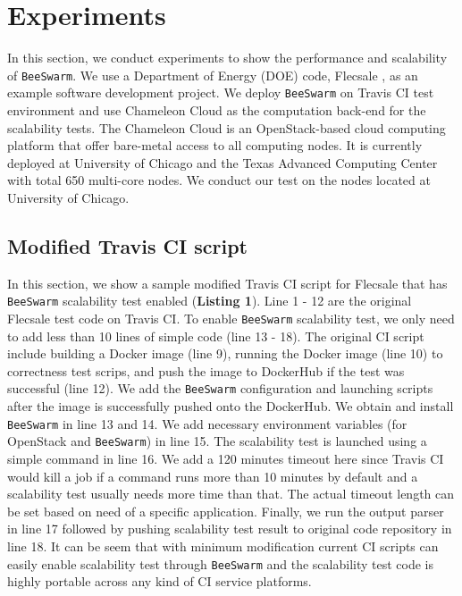 \section{Experiments}
\label{experiments}
In this section, we conduct experiments to show the performance and scalability of \texttt{BeeSwarm}. We use a Department of Energy (DOE) code, Flecsale \cite{charest2017flexible}, as an example software development project. We deploy \texttt{BeeSwarm} on Travis CI test environment and use Chameleon Cloud \cite{mambretti2015next} as the computation back-end for the scalability tests. The Chameleon Cloud is an OpenStack-based cloud computing platform that offer bare-metal access to all computing nodes. It is currently deployed at University of Chicago and the Texas Advanced Computing Center with total 650 multi-core nodes. We conduct our test on the nodes located at University of Chicago. 

\subsection{Modified Travis CI script}
In this section, we show a sample modified Travis CI script for Flecsale that has \texttt{BeeSwarm} scalability test enabled (\textbf{Listing 1}). Line 1 - 12 are the original Flecsale test code on Travis CI. To enable \texttt{BeeSwarm} scalability test, we only need to add less than 10 lines of simple code (line 13 - 18). The original CI script include building a Docker image  (line 9), running the Docker image (line 10) to correctness test scrips, and push the image to DockerHub if the test was successful (line 12). We add the \texttt{BeeSwarm} configuration and launching scripts after the image is successfully pushed onto the DockerHub. We obtain and install \texttt{BeeSwarm} in line 13 and 14. We add necessary environment variables (for OpenStack and \texttt{BeeSwarm}) in line 15. The scalability test is launched using a simple command in line 16. We add a 120 minutes timeout here since Travis CI would kill a job if a command runs more than 10 minutes by default and a scalability test usually needs more time than that. The actual timeout length can be set based on need of a specific application. Finally, we run the output parser in line 17 followed by pushing scalability test result to original code repository in line 18. It can be seem that with minimum modification current CI scripts can easily enable scalability test through \texttt{BeeSwarm} and the scalability test code is highly portable across any kind of CI service platforms.

